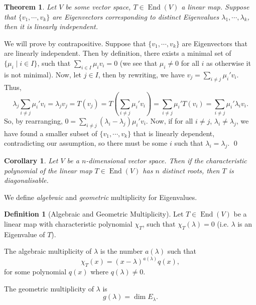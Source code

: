 \documentclass[
]{article}
\newtheorem{theorem}{Theorem}
\newtheorem{corollary}{Corollary}[theorem]
\theoremstyle{definition}
\newtheorem{definition}{Definition}[section]
\begin{document}
\begin{theorem}\label{eigen_li}
  Let \(V\) be some vector space, \(T \in \mathop{\mathrm{End}}(V)\) a linear map. Suppose that 
  \(\{v_1, \cdots, v_k\}\) are Eigenvectors corresponding to distinct 
  Eigenvalues \(\lambda_1, \cdots, \lambda_k\), then it is linearly independent.
\end{theorem}
\proof

We will prove by contrapositive. Suppose that \(\{v_1, \cdots, v_k\}\)
are Eigenvectors that are linearly independent. Then by definition,
there exists a minimal set of \(\{\mu_i \mid i \in I\}\), such that
\(\sum_{i \in I} \mu_i v_i = 0\) (we see that \(\mu_i \neq 0\) for all
\(i\) as otherwise it is not minimal). Now, let \(j \in I\), then by
rewriting, we have \(v_j = \sum_{i \neq j}\mu_i' v_i\). Thus, \[
    \lambda_j \sum_{i \neq j} \mu_i' v_i = \lambda_j v_j = T(v_j)
      = T\left(\sum_{i \neq j} \mu_i' v_i\right) 
      = \sum_{i \neq j} \mu_i' T(v_i) 
      = \sum_{i \neq j} \mu_i' \lambda_i v_i.
  \] So, by rearranging,
\(0 = \sum_{i \neq j}(\lambda_i - \lambda_j)\mu_i' v_i\). Now, if for
all \(i \neq j\), \(\lambda_i \neq \lambda_j\), we have found a smaller
subset of \(\{v_1, \cdots, v_k\}\) that is linearly dependent,
contradicting our assumption, so there must be some \(i\) such that
\(\lambda_i = \lambda_j\). \qed

\begin{corollary}
  Let \(V\) be a \(n\)-dimensional vector space. Then if the characteristic 
  polynomial of the linear map \(T \in \mathop{\mathrm{End}}(V)\) has \(n\) distinct roots, then 
  \(T\) is diagonalisable. 
\end{corollary}

We define \emph{algebraic} and \emph{geometric} multiplicity for
Eigenvalues.

\begin{definition}[Algebraic and Geometric Multiplicity]
  Let \(T \in \mathop{\mathrm{End}}(V)\) be a linear map with characteristic polynomial \(\chi_T\),
  such that \(\chi_T(\lambda) = 0\) (i.e. \(\lambda\) is an Eigenvalue of \(T\)).

  The algebraic multiplicity of \(\lambda\) is the number \(a(\lambda)\) such 
  that
  \[\chi_T(x) = (x - \lambda)^{a(\lambda)} q(x),\]
  for some polynomial \(q(x)\) where \(q(\lambda) \neq 0\).

  The geometric multiplicity of \(\lambda\) is
  \[g(\lambda) = \dim E_{\lambda}.\]
\end{definition}
\end{document}
